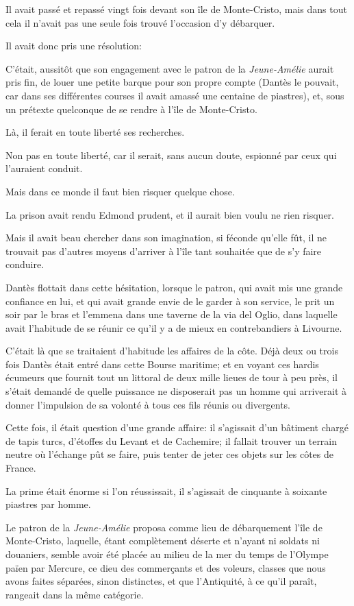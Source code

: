 Il avait passé et repassé vingt fois devant son île de Monte-Cristo, mais dans tout cela il n'avait pas une seule fois trouvé l'occasion d'y débarquer.

Il avait donc pris une résolution:

C'était, aussitôt que son engagement avec le patron de la \textit{Jeune-Amélie} aurait pris fin, de louer une petite barque pour son propre compte (Dantès le pouvait, car dans ses différentes courses il avait amassé une centaine de piastres), et, sous un prétexte quelconque de se rendre à l'île de Monte-Cristo.

Là, il ferait en toute liberté ses recherches.

Non pas en toute liberté, car il serait, sans aucun doute, espionné par ceux qui l'auraient conduit.

Mais dans ce monde il faut bien risquer quelque chose.

La prison avait rendu Edmond prudent, et il aurait bien voulu ne rien risquer.

Mais il avait beau chercher dans son imagination, si féconde qu'elle fût, il ne trouvait pas d'autres moyens d'arriver à l'île tant souhaitée que de s'y faire conduire.

Dantès flottait dans cette hésitation, lorsque le patron, qui avait mis une grande confiance en lui, et qui avait grande envie de le garder à son service, le prit un soir par le bras et l'emmena dans une taverne de la via del Oglio, dans laquelle avait l'habitude de se réunir ce qu'il y a de mieux en contrebandiers à Livourne.

C'était là que se traitaient d'habitude les affaires de la côte. Déjà deux ou trois fois Dantès était entré dans cette Bourse maritime; et en voyant ces hardis écumeurs que fournit tout un littoral de deux mille lieues de tour à peu près, il s'était demandé de quelle puissance ne disposerait pas un homme qui arriverait à donner l'impulsion de sa volonté à tous ces fils réunis ou divergents.

Cette fois, il était question d'une grande affaire: il s'agissait d'un bâtiment chargé de tapis turcs, d'étoffes du Levant et de Cachemire; il fallait trouver un terrain neutre où l'échange pût se faire, puis tenter de jeter ces objets sur les côtes de France.

La prime était énorme si l'on réussissait, il s'agissait de cinquante à soixante piastres par homme.

Le patron de la \textit{Jeune-Amélie} proposa comme lieu de débarquement l'île de Monte-Cristo, laquelle, étant complètement déserte et n'ayant ni soldats ni douaniers, semble avoir été placée au milieu de la mer du temps de l'Olympe païen par Mercure, ce dieu des commerçants et des voleurs, classes que nous avons faites séparées, sinon distinctes, et que l'Antiquité, à ce qu'il paraît, rangeait dans la même catégorie.

